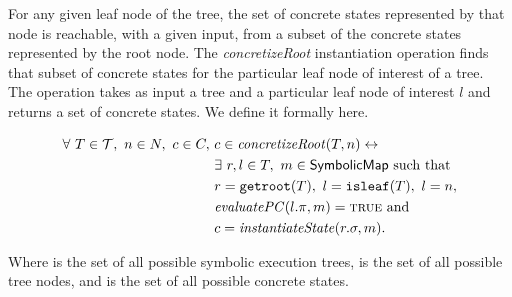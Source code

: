 

\begin{mydefinition}
  \label{def:concroot}
  
  For any given leaf node of the
  tree, the set of concrete states represented by that node is reachable, with a
  given input, from a subset of the concrete states represented by the root
  node. The \emph{concretizeRoot} instantiation operation finds that subset of concrete states
  for the particular leaf node of interest of a tree. The operation takes as
  input a tree \tree{} and a particular leaf node of interest $l$ and returns
  a set of concrete states. We define it formally here. 


  \begin{align*}
\forall~ T \in \mathcal{T},~n \in N,~ c \in C,~& c \in
\mathit{concretizeRoot}(T,n) \leftrightarrow \\
&\exists~ r,l \in T,~m \in \textsf{SymbolicMap} \mathrm{~such~that}\\
&r = \mathtt{getroot}(T),~ l = \mathtt{isleaf}(T),~ l = n,\\
&\mathit{evaluatePC}(l.\pi, m) = \mathtt{\textsc{true}}~ \mathrm{and} \\
&c = \mathit{instantiateState}(r.\sigma, m).
    \end{align*}
\end{mydefinition}



Where \trees{} is the set of all possible symbolic execution trees, \nodes{} is
the set of all possible tree nodes, and
\concstates{} is the set of all possible concrete states.

